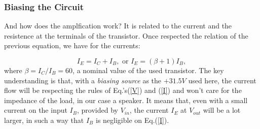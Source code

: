 \documentclass{article}
\begin{document}
\subsubsection{Biasing the Circuit}

And how does the amplfication work? It is related to the current and the resistence at the terminals of the transistor. Once respected the relation of the previous equation, we have for the currents:

\begin{equation}
I_{E}=I_{C}+I_{B}, \text{ or }I_{E}=(\beta +1)I_{B},
\label{I}
\end{equation}
where $\beta=I_{C}/I_{B}=60$, a nominal value of the used
transistor. The key understanding is that, with a \emph{biasing source} as the
$+31.5V$ used here, the current flow will be respecting the rules of
Eq.'s(\ref{V}) and (\ref{I}) and won't care for the impedance of the
load, in our case a speaker. It means that, even with a small current on
the input $I_{B}$, provided by $V_{in}$, the current $I_{E}$ at
$V_{out}$ will be a lot larger, in such a way that $I_{B}$ is negligible
on Eq.(\ref{I}). 
\end{document}
